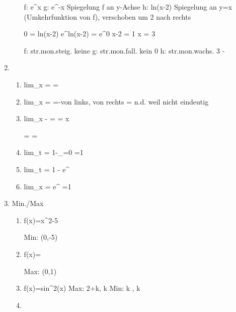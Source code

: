 \begin{enumerate}
\begin{enumerate}
f:	e^x			
g:	e^{-x}		Spiegelung f an y-Achse
h:	ln(x-2)		Spiegelung an y=x (Umkehrfunktion von f), verschoben um 2 nach rechts

0 = ln(x-2)
 e^{ln(x-2)} = e^0
 x-2 = 1
 x = 3

f:						str.mon.steig.	keine						
g:						str.mon.fall.	kein			0						\infty		
h:						str.mon.wachs.	3				\infty					-\infty

\end{enumerate}

\item

\begin{enumerate}

\item
lim_{x \rightarrow \infty} = 
=

\item
lim_{x } = 
=-\infty von links, \infty von rechts
= n.d. weil nicht eindeutig

\item
lim_{x \rightarrow -\infty} = 
= x 

= 
= 


\item
lim_{t \rightarrow \infty} = 1-_{=0}
=1


\item
lim_{t } = 1 - e^



\item
lim_{x \rightarrow \infty} = e^{}
=1

\end{enumerate}

\item
Min./Max

\begin{enumerate}

\item
f(x)=x^2-5

Min: (0,-5)

\item
f(x)=

Max: (0,1)

\item
f(x)=sin^2(x)
Max: {\pi}{2}+\pi k, k \in \Z
Min: \pi k , k \in \Z

\item


\end{enumerate}

\end{enumerate}
